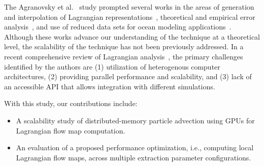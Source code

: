 The Agranovsky et al.~\cite{agranovsky2014improved} study prompted several works in the areas of generation and interpolation of Lagrangian representations~\cite{chandler2015interpolation, sane2019interpolation, rapp2019void}, theoretical and empirical error analysis~\cite{bujack2015lagrangian, chandler2016analysis, hummel2016error, sane2018revisiting}, and use of reduced data sets for ocean modeling applications~\cite{envirvis.20171099}.
%
Although these works advance our understanding of the technique at a theoretical level, the scalability of the technique has not been previously addressed. 
%
%
In a recent comprehensive review of Lagrangian analysis~\cite{VANSEBILLE201849}, the primary challenges identified by the authors are (1) utilization of heterogenous computer architectures, (2) providing parallel performance and scalability, and (3) lack of an accessible API that allows integration with different simulations. 
%

With this study, our contributions include:
\begin{itemize}[leftmargin=*]
\item A scalability study of distributed-memory particle advection using GPUs for Lagrangian flow map computation. 
\item An evaluation of a proposed performance optimization, i.e., computing local Lagrangian flow maps, across multiple extraction parameter configurations.
\end{itemize}

%
%

%
%
%
%


